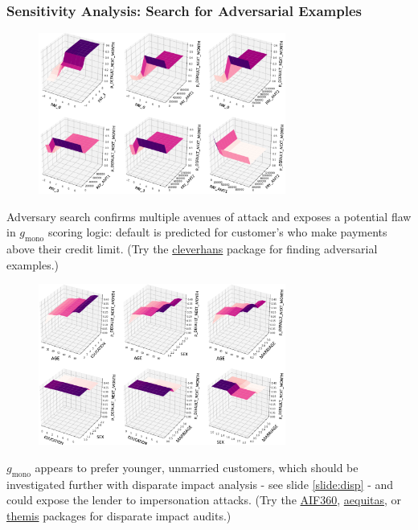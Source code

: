 \documentclass[11pt,
               aspectratio=43,
               hyperref={colorlinks}
               ]{beamer}
\begin{document}
			\begin{frame}[t, allowframebreaks]
				\vspace{-10pt}
				\frametitle{\textbf{Sensitivity Analysis}: Search for Adversarial Examples}
				\begin{figure}
					\begin{center}
						\includegraphics[height=150pt]{img/sa_max_prob.png}
					\end{center}
				\end{figure}
				\tiny{Adversary search confirms multiple avenues of attack and exposes a potential flaw in $g_{\text{mono}}$ scoring logic: default is predicted for customer's who make payments above their credit limit. (Try the \href{https://github.com/tensorflow/cleverhans}{cleverhans} package for finding adversarial examples.)}
					
				\framebreak
				\vspace{-5pt}
				\begin{figure}
					\begin{center}
						\includegraphics[height=150pt]{img/sa_max_prob_demo.png}
					\end{center}
				\end{figure}
				\vspace{-5pt}
				\tiny{$g_{\text{mono}}$ appears to prefer younger, unmarried customers, which should be investigated further with disparate impact analysis - see slide \ref{slide:disp} - and could expose the lender to impersonation attacks. (Try the \href{https://github.com/IBM/AIF360}{AIF360}, \href{https://github.com/dssg/aequitas}{aequitas}, or \href{https://github.com/LASER-UMASS/Themis}{themis} packages for disparate impact audits.)}
		
			\end{frame}			
			
\end{document}

